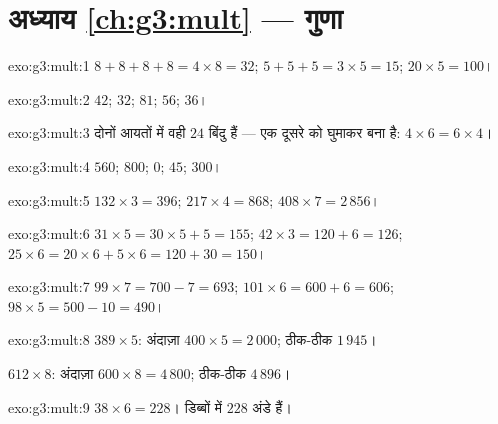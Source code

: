\section*{अध्याय \ref{ch:g3:mult} --- गुणा}

\begin{solution}{exo:g3:mult:1}
$8 + 8 + 8 + 8 = 4 \times 8 = 32$; \quad
$5 + 5 + 5 = 3 \times 5 = 15$; \quad
$20 \times 5 = 100$।
\end{solution}

\begin{solution}{exo:g3:mult:2}
$42$; \quad $32$; \quad $81$; \quad $56$; \quad $36$।
\end{solution}

\begin{solution}{exo:g3:mult:3}
दोनों आयतों में वही $24$ बिंदु हैं --- एक दूसरे को घुमाकर बना
है: $4 \times 6 = 6 \times 4$।
\end{solution}

\begin{solution}{exo:g3:mult:4}
$560$; \quad $800$; \quad $0$; \quad $45$; \quad $300$।
\end{solution}

\begin{solution}{exo:g3:mult:5}
$132 \times 3 = 396$; \quad
$217 \times 4 = 868$; \quad
$408 \times 7 = 2\,856$।
\end{solution}

\begin{solution}{exo:g3:mult:6}
$31 \times 5 = 30 \times 5 + 5 = 155$; \quad
$42 \times 3 = 120 + 6 = 126$; \quad
$25 \times 6 = 20 \times 6 + 5 \times 6 = 120 + 30 = 150$।
\end{solution}

\begin{solution}{exo:g3:mult:7}
$99 \times 7 = 700 - 7 = 693$; \quad
$101 \times 6 = 600 + 6 = 606$; \quad
$98 \times 5 = 500 - 10 = 490$।
\end{solution}

\begin{solution}{exo:g3:mult:8}
$389 \times 5$: अंदाज़ा $400 \times 5 = 2\,000$; ठीक-ठीक
$1\,945$।

$612 \times 8$: अंदाज़ा $600 \times 8 = 4\,800$; ठीक-ठीक $4\,896$।
\end{solution}

\begin{solution}{exo:g3:mult:9}
$38 \times 6 = 228$। डिब्बों में $228$ अंडे हैं।
\end{solution}

